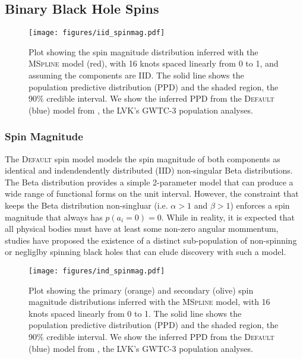 \subsection{Binary Black Hole Spins} \label{sec:spin_dist}

\begin{figure}
    \texttt{[image: figures/iid\_spinmag.pdf]}
    \caption{Plot showing the spin magnitude distribution inferred with the \textsc{MSpline} model (red), with 16 knots spaced linearly from 0 to 1, and 
    assuming the components are IID. The solid line shows the population predictive distribution (PPD) and the shaded region, the 90\% credible interval. 
    We show the inferred PPD from the \textsc{Default} (blue) model from \citet{o3b_astro_dist}, the LVK's GWTC-3 population analyses.}
    \label{fig:iid_spinmag_dist}
\end{figure}

\subsubsection{Spin Magnitude}

The \textsc{Default} spin model models the spin magnitude of both components as identical and indendendently distributed (IID) non-singular Beta distributions. The
Beta distribution provides a simple 2-parameter model that can produce a wide range of functional forms on the unit interval. However, the constraint that keeps 
the Beta distribution non-singluar (i.e. $\alpha>1$ and $\beta>1$) enforces a spin magnitude that always has $p(a_i=0) = 0$. While in reality, it is expected that 
all physical bodies must have at least some non-zero angular mommentum, studies have proposed the existence of a distinct sub-population of non-spinning or 
negliglby spinning black holes that can elude discovery with such a model. 

\begin{figure}
    \texttt{[image: figures/ind\_spinmag.pdf]}
    \caption{Plot showing the primary (orange) and secondary (olive) spin magnitude distributions inferred with the \textsc{MSpline} model, 
    with 16 knots spaced linearly from 0 to 1. The solid line shows the population predictive distribution (PPD) and the shaded region, the 90\% credible interval. 
    We show the inferred PPD from the \textsc{Default} (blue) model from \citet{o3b_astro_dist}, the LVK's GWTC-3 population analyses.}
    \label{fig:ind_spinmag_dist}
\end{figure}


